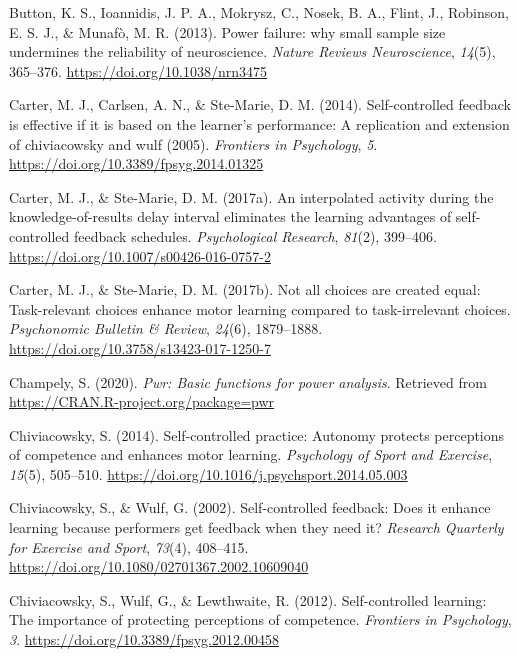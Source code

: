 \documentclass[
  english,
  man, donotrepeattitle,floatsintext]{apa7}
\newlength{\cslhangindent}
\newlength{\cslentryspacingunit} %
\newenvironment{CSLReferences}[2] %
 {%
  \setlength{\parindent}{0pt}
  \ifodd #1
  \let\oldpar\par
  \def\par{\hangindent=\cslhangindent\oldpar}
  \fi
  \setlength{\parskip}{#2\cslentryspacingunit}
 }%
 {}
\begin{document}
\begin{CSLReferences}{1}{0}
\leavevmode{}%
Button, K. S., Ioannidis, J. P. A., Mokrysz, C., Nosek, B. A., Flint, J., Robinson, E. S. J., \& Munafò, M. R. (2013). Power failure: why small sample size undermines the reliability of neuroscience. \emph{Nature Reviews Neuroscience}, \emph{14}(5), 365--376. \url{https://doi.org/10.1038/nrn3475}

\leavevmode{}%
Carter, M. J., Carlsen, A. N., \& Ste-Marie, D. M. (2014). Self-controlled feedback is effective if it is based on the learner{'}s performance: A replication and extension of chiviacowsky and wulf (2005). \emph{Frontiers in Psychology}, \emph{5}. \url{https://doi.org/10.3389/fpsyg.2014.01325}

\leavevmode{}%
Carter, M. J., \& Ste-Marie, D. M. (2017a). An interpolated activity during the knowledge-of-results delay interval eliminates the learning advantages of self-controlled feedback schedules. \emph{Psychological Research}, \emph{81}(2), 399--406. \url{https://doi.org/10.1007/s00426-016-0757-2}

\leavevmode{}%
Carter, M. J., \& Ste-Marie, D. M. (2017b). Not all choices are created equal: Task-relevant choices enhance motor learning compared to task-irrelevant choices. \emph{Psychonomic Bulletin \& Review}, \emph{24}(6), 1879--1888. \url{https://doi.org/10.3758/s13423-017-1250-7}

\leavevmode{}%
Champely, S. (2020). \emph{Pwr: Basic functions for power analysis}. Retrieved from \url{https://CRAN.R-project.org/package=pwr}

\leavevmode{}%
Chiviacowsky, S. (2014). Self-controlled practice: Autonomy protects perceptions of competence and enhances motor learning. \emph{Psychology of Sport and Exercise}, \emph{15}(5), 505--510. \url{https://doi.org/10.1016/j.psychsport.2014.05.003}

\leavevmode{}%
Chiviacowsky, S., \& Wulf, G. (2002). Self-controlled feedback: Does it enhance learning because performers get feedback when they need it? \emph{Research Quarterly for Exercise and Sport}, \emph{73}(4), 408--415. \url{https://doi.org/10.1080/02701367.2002.10609040}

\leavevmode{}%
Chiviacowsky, S., Wulf, G., \& Lewthwaite, R. (2012). Self-controlled learning: The importance of protecting perceptions of competence. \emph{Frontiers in Psychology}, \emph{3}. \url{https://doi.org/10.3389/fpsyg.2012.00458}


\end{CSLReferences}
\end{document}
